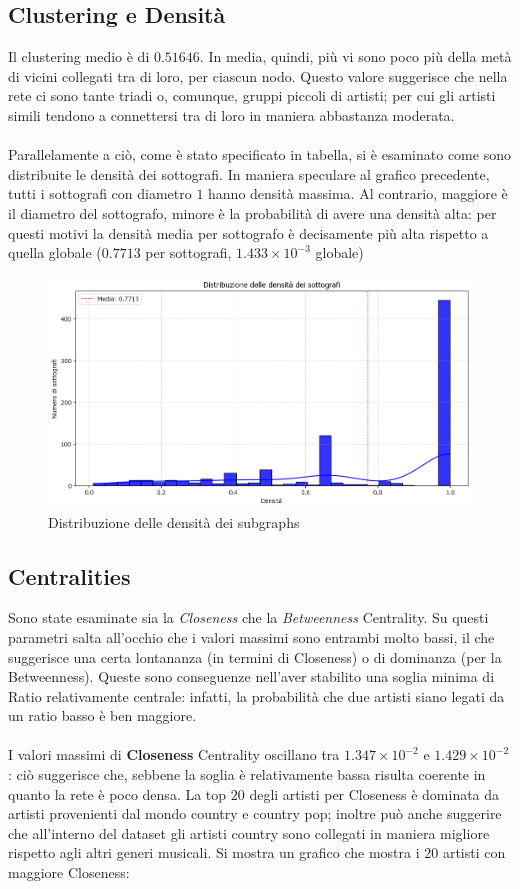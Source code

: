 \documentclass[sigchi]{acmart}
\begin{document}
\subsection{Clustering e Densità}

Il clustering medio è di $0.51646$. In media, quindi, più vi sono poco più della metà di vicini collegati tra di loro, per ciascun nodo. Questo valore suggerisce che nella rete ci sono tante triadi o, comunque, gruppi piccoli di artisti; per cui gli artisti simili tendono a connettersi tra di loro in maniera abbastanza moderata. \\ \\ Parallelamente a ciò, come è stato specificato in tabella, si è esaminato come sono distribuite le densità dei sottografi. In maniera speculare al grafico precedente, tutti i sottografi con diametro $1$ hanno densità massima. Al contrario, maggiore è il diametro del sottografo, minore è la probabilità di avere una densità alta: per questi motivi la densità media per sottografo è decisamente più alta rispetto a quella globale ($0.7713$ per sottografi, $1.433 \times 10^{-3}$ globale)

\begin{figure}[H]
\centering
\includegraphics[width=0.45
\textwidth]{../network_analysis/plots/2_6/densDist.png}
\caption{Distribuzione delle densità dei subgraphs}
\label{fig:densDist}
\end{figure}


\subsection{Centralities}

Sono state esaminate sia la {\itshape Closeness} che la {\itshape Betweenness} Centrality. Su questi parametri salta all'occhio che i valori massimi sono entrambi molto bassi, il che suggerisce una certa lontananza (in termini di Closeness) o di dominanza (per la Betweenness). Queste sono conseguenze nell'aver stabilito una soglia minima di Ratio relativamente centrale: infatti, la probabilità che due artisti siano legati da un ratio basso è ben maggiore. \\ \\ I valori massimi di {\bfseries Closeness} Centrality oscillano tra $1.347 \times 10^{-2}$ e $1.429 \times 10^{-2}$: ciò suggerisce che, sebbene la soglia è relativamente bassa risulta coerente in quanto la rete è poco densa. La top $20$ degli artisti per Closeness è dominata da artisti provenienti dal mondo country e country pop; inoltre può anche suggerire che all'interno del dataset gli artisti country sono collegati in maniera migliore rispetto agli altri generi musicali. Si mostra un grafico che mostra i $20$ artisti con maggiore Closeness:
\end{document}
